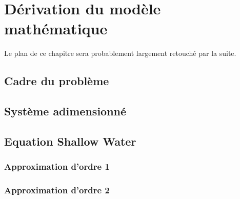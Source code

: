 
\chapter{Dérivation du modèle mathématique}

Le plan de ce chapitre sera probablement largement retouché par la suite.

\section{Cadre du problème}


\section{Système adimensionné}



\section{Equation Shallow Water}

\subsection{Approximation d'ordre 1}

\subsection{Approximation d'ordre 2}


